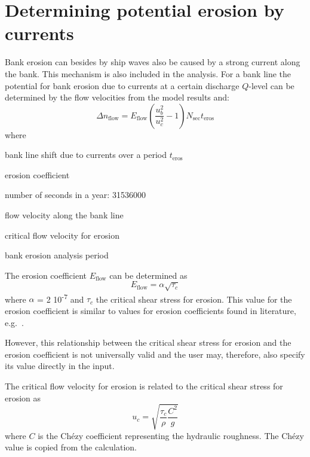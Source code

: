 \clearpage
\section{Determining potential erosion by currents} \label{Sec4.2}

Bank erosion can besides by ship waves also be caused by a strong current along the bank.
This mechanism is also included in the \dfastbe analysis.
For a bank line the potential for bank erosion due to currents at a certain discharge $Q$-level can be determined by the flow velocities from the model results and:
%
\begin{equation}
\Delta n_\text{flow} = E_\text{flow} \left ( \frac{u_b^2}{u_c^2} - 1 \right ) N_\text{sec} t_\text{eros}
\end{equation}
%
where
%
\begin{symbollist}
\item[$\Delta n_\text{flow}$] bank line shift due to currents over a period $t_\text{eros}$ 
\item[$E_\text{flow}$] erosion coefficient 
\item[$N_\text{sec}$] number of seconds in a year: 31536000 \unitbrackets{-}
\item[$u_b$] flow velocity along the bank line 
\item[$u_c$] critical flow velocity for erosion 
\item[$t_\text{eros}$] bank erosion analysis period 
\end{symbollist}
%
The erosion coefficient $E_\text{flow}$ can be determined as
%
\begin{equation}
E_\text{flow} = \alpha \sqrt{\tau_c}
\end{equation}
%
where $\alpha$ = 2 10\textsuperscript{-7}  and $\tau_c$  the critical shear stress for erosion.
This value for the erosion coefficient is similar to values for erosion coefficients found in literature, e.g.~\citet{Crosato07}.

However, this relationship between the critical shear stress for erosion and the erosion coefficient is not universally valid and the user may, therefore, also specify its value directly in the input.

The critical flow velocity for erosion is related to the critical shear stress for erosion as
%
\begin{equation}
u_c = \sqrt{\frac{\tau_c}{\rho} \frac{C^2}{g}}
\end{equation}
%
where $C$  is the Ch\'ezy coefficient representing the hydraulic roughness.
The Ch\'ezy value is copied from the \dflowfm calculation.

